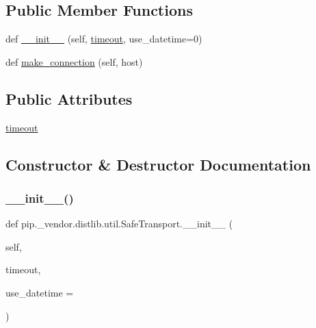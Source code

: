 \subsection*{Public Member Functions}
\begin{DoxyCompactItemize}
\item 
def \hyperlink{classpip_1_1__vendor_1_1distlib_1_1util_1_1SafeTransport_a80b4b0ff36215da07a0fa778f58d742a}{\+\_\+\+\_\+init\+\_\+\+\_\+} (self, \hyperlink{classpip_1_1__vendor_1_1distlib_1_1util_1_1SafeTransport_a073b6505bd498f6950cc644a13aec44d}{timeout}, use\+\_\+datetime=0)
\item 
def \hyperlink{classpip_1_1__vendor_1_1distlib_1_1util_1_1SafeTransport_a8c2d3f7af9868294a6a2809cf201fc6f}{make\+\_\+connection} (self, host)
\end{DoxyCompactItemize}
\subsection*{Public Attributes}
\begin{DoxyCompactItemize}
\item 
\hyperlink{classpip_1_1__vendor_1_1distlib_1_1util_1_1SafeTransport_a073b6505bd498f6950cc644a13aec44d}{timeout}
\end{DoxyCompactItemize}


\subsection{Constructor \& Destructor Documentation}
\mbox{\label{classpip_1_1__vendor_1_1distlib_1_1util_1_1SafeTransport_a80b4b0ff36215da07a0fa778f58d742a}} 
\subsubsection{\texorpdfstring{\+\_\+\+\_\+init\+\_\+\+\_\+()}{\_\_init\_\_()}}
{\footnotesize\ttfamily def pip.\+\_\+vendor.\+distlib.\+util.\+Safe\+Transport.\+\_\+\+\_\+init\+\_\+\+\_\+ (\begin{DoxyParamCaption}\item[{}]{self,  }\item[{}]{timeout,  }\item[{}]{use\+\_\+datetime = {} }\end{DoxyParamCaption})}



